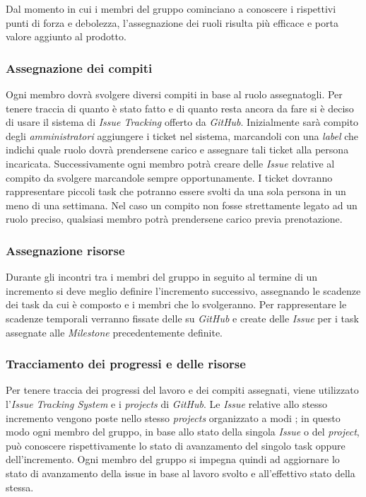 Dal momento in cui i membri del gruppo cominciano a conoscere i rispettivi punti di forza e debolezza, l'assegnazione dei ruoli risulta
più efficace e porta valore aggiunto al prodotto.

\subsubsection{Assegnazione dei compiti}

Ogni membro dovrà svolgere diversi compiti in base al ruolo assegnatogli. Per tenere traccia di quanto è stato fatto e
di quanto resta ancora da fare si è deciso di usare il sistema di \emph{Issue Tracking} offerto da \emph{GitHub}. Inizialmente sarà compito
degli \emph{amministratori} aggiungere i ticket nel sistema, marcandoli con una \emph{label} che indichi quale ruolo
dovrà prendersene carico e assegnare tali ticket alla persona incaricata. Successivamente ogni membro potrà creare delle \emph{Issue}
relative al compito da svolgere marcandole sempre opportunamente. I ticket dovranno rappresentare piccoli task che potranno essere svolti
da una sola persona in un meno di una settimana. Nel caso un compito non fosse strettamente legato ad un ruolo preciso, qualsiasi membro
potrà prendersene carico previa prenotazione.

\subsubsection{Assegnazione risorse}

Durante gli incontri tra i membri del gruppo in seguito al termine di un incremento si deve meglio definire l'incremento successivo,
assegnando le scadenze dei task da cui è composto e i membri che lo svolgeranno. Per rappresentare le scadenze temporali verranno fissate
delle  su \emph{GitHub} e create delle \emph{Issue} per i task assegnate alle \emph{Milestone} precedentemente definite.

\subsubsection{Tracciamento dei progressi e delle risorse}
\label{ssub:pianificazione:tracciamento}
Per tenere traccia dei progressi del lavoro e dei compiti assegnati, viene utilizzato l'\emph{Issue Tracking System} e i
\emph{projects} di \emph{GitHub}. Le \emph{Issue} relative allo stesso incremento vengono poste nello stesso \emph{projects} organizzato a
modi ; in questo modo ogni membro del gruppo, in base allo stato della singola \emph{Issue} o del \emph{project},
può conoscere rispettivamente lo stato di avanzamento del singolo task oppure dell'incremento. Ogni membro del gruppo si impegna quindi ad
aggiornare lo stato di avanzamento della issue in base al lavoro svolto e all'effettivo stato della stessa.

